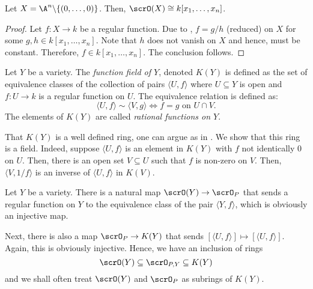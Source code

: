 \begin{corollary}
    Let $X = \A^n\backslash\{(0,\dots,0)\}$. Then, $\scrO(X)\cong k[x_1,\dots,x_n]$.
\end{corollary}
\begin{proof}
    Let $f: X\to k$ be a regular function. Due to , $f = g/h$ (reduced) on $X$ for some $g,h\in k[x_1,\dots,x_n]$. Note that $h$ does not vanish on $X$ and hence, must be constant. Therefore, $f\in k[x_1,\dots,x_n]$. The conclusion follows.
\end{proof}

\begin{definition}
    Let $Y$ be a variety. The \emph{function field of $Y$}, denoted $K(Y)$ is defined as the set of equivalence classes of the collection of pairs $\langle U, f\rangle$ where $U\subseteq Y$ is open and $f: U\to k$ is a regular function on $U$. The equivalence relation is defined as: 
    \begin{equation*}
        \langle U, f\rangle\sim\langle V, g\rangle\iff f = g\text{ on } U\cap V.
    \end{equation*}
    The elements of $K(Y)$ are called \emph{rational functions on $Y$}.
\end{definition}
\begin{remark}
    That $K(Y)$ is a well defined ring, one can argue as in . We show that this ring is a field. Indeed, suppose $\langle U, f\rangle$ is an element in $K(Y)$ with $f$ not identically $0$ on $U$. Then, there is an open set $V\subseteq U$ such that $f$ is non-zero on $V$. Then, $\langle V, 1/f\rangle$ is an inverse of $\langle U, f\rangle$ in $K(V)$.
\end{remark}

\begin{remark}
    Let $Y$ be a variety. There is a natural map $\scrO(Y)\to\scrO_P$ that sends a regular function on $Y$ to the equivalence class of the pair $\langle Y, f\rangle$, which is obviously an injective map. 

    Next, there is also a map $\scrO_P\to K(Y)$ that sends $[\langle U, f\rangle]\mapsto[\langle U, f\rangle]$. Again, this is obviously injective. Hence, we have an inclusion of rings 
    \begin{equation*}
        \scrO(Y)\subseteq\scrO_{P, Y}\subseteq K(Y)
    \end{equation*}
    and we shall often treat $\scrO(Y)$ and $\scrO_P$ as subrings of $K(Y)$.
\end{remark}

